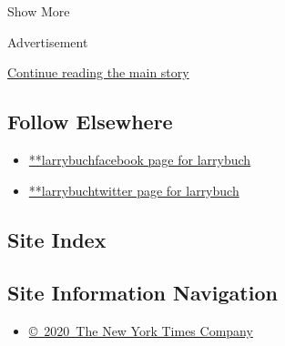 Show More

Advertisement

\protect\hyperlink{after-mid2}{Continue reading the main story}

\hypertarget{follow-elsewhere}{%
\subsection{Follow Elsewhere}\label{follow-elsewhere}}

\begin{itemize}
\tightlist
\item
  \href{https://www.facebookcorewwwi.onion/larrybuch}{**larrybuchfacebook
  page for larrybuch}
\item
  \href{https://twitter.com/larrybuch}{**larrybuchtwitter page for
  larrybuch}
\end{itemize}

\hypertarget{site-index}{%
\subsection{Site Index}\label{site-index}}

\hypertarget{site-information-navigation}{%
\subsection{Site Information
Navigation}\label{site-information-navigation}}

\begin{itemize}
\tightlist
\item
  \href{https://help.nytimes3xbfgragh.onion/hc/en-us/articles/115014792127-Copyright-notice}{©~2020~The
  New York Times Company}
\end{itemize}

